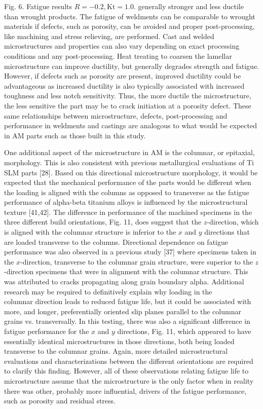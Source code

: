 \documentclass[10pt]{article}
\begin{document}
Fig. 6. Fatigue results $R=-0.2, \mathrm{Kt}=1.0$. generally stronger and less ductile than wrought products. The fatigue of weldments can be comparable to wrought materials if defects, such as porosity, can be avoided and proper post-processing, like machining and stress relieving, are performed. Cast and welded microstructures and properties can also vary depending on exact processing conditions and any post-processing. Heat treating to coarsen the lamellar microstructure can improve ductility, but generally degrades strength and fatigue. However, if defects such as porosity are present, improved ductility could be advantageous as increased ductility is also typically associated with increased toughness and less notch sensitivity. Thus, the more ductile the microstructure, the less sensitive the part may be to crack initiation at a porosity defect. These same relationships between microstructure, defects, post-processing and performance in weldments and castings are analogous to what would be expected in AM parts such as those built in this study.

One additional aspect of the microstructure in AM is the columnar, or epitaxial, morphology. This is also consistent with previous metallurgical evaluations of Ti SLM parts [28]. Based on this directional microstructure morphology, it would be expected that the mechanical performance of the parts would be different when the loading is aligned with the columns as opposed to transverse as the fatigue performance of alpha-beta titanium alloys is influenced by the microstructural texture [41,42]. The difference in performance of the machined specimens in the three different build orientations, Fig. 11, does suggest that the $z$-direction, which is aligned with the columnar structure is inferior to the $x$ and $y$ directions that are loaded transverse to the columns. Directional dependence on fatigue performance was also observed in a previous study [37] where specimens taken in the $x$-direction, transverse to the columnar grain structure, were superior to the $z$-direction specimens that were in alignment with the columnar structure. This was attributed to cracks propagating along grain boundary alpha. Additional research may be required to definitively explain why loading in the\\
columnar direction leads to reduced fatigue life, but it could be associated with more, and longer, preferentially oriented slip planes parallel to the columnar grains vs. transversally. In this testing, there was also a significant difference in fatigue performance for the $x$ and $y$ directions, Fig. 11, which appeared to have essentially identical microstructures in those directions, both being loaded transverse to the columnar grains. Again, more detailed microstructural evaluations and characterizations between the different orientations are required to clarify this finding. However, all of these observations relating fatigue life to microstructure assume that the microstructure is the only factor when in reality there was other, probably more influential, drivers of the fatigue performance, such as porosity and residual stress.
\end{document}
